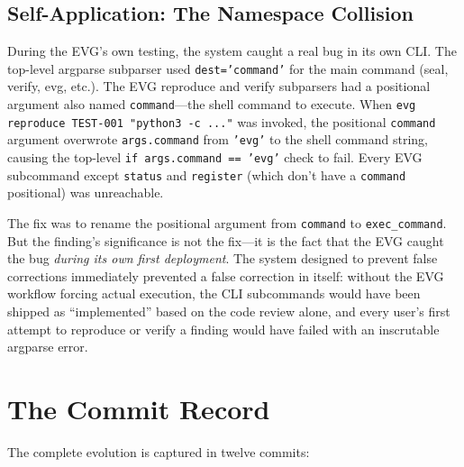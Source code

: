 \documentclass[11pt,a4paper]{article}
\begin{document}
\subsection{Self-Application: The Namespace Collision}

During the EVG's own testing, the system caught a real bug in its own CLI. The top-level argparse subparser used \texttt{dest='command'} for the main command (seal, verify, evg, etc.). The EVG reproduce and verify subparsers had a positional argument also named \texttt{command}---the shell command to execute. When \texttt{evg reproduce TEST-001 "python3 -c ..."} was invoked, the positional \texttt{command} argument overwrote \texttt{args.command} from \texttt{'evg'} to the shell command string, causing the top-level \texttt{if args.command == 'evg'} check to fail. Every EVG subcommand except \texttt{status} and \texttt{register} (which don't have a \texttt{command} positional) was unreachable.

The fix was to rename the positional argument from \texttt{command} to \texttt{exec\_command}. But the finding's significance is not the fix---it is the fact that the EVG caught the bug \textit{during its own first deployment}. The system designed to prevent false corrections immediately prevented a false correction in itself: without the EVG workflow forcing actual execution, the CLI subcommands would have been shipped as ``implemented'' based on the code review alone, and every user's first attempt to reproduce or verify a finding would have failed with an inscrutable argparse error.


\section{The Commit Record}

The complete evolution is captured in twelve commits:
\end{document}
